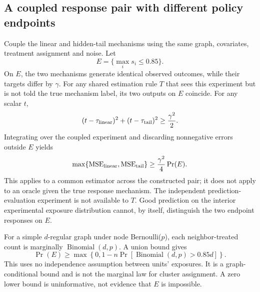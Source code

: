 \subsection{A coupled response pair with different policy endpoints}
\label{app:coupling}
Couple the linear and hidden-tail mechanisms using the same graph, covariates, treatment assignment and noise. Let
\begin{equation}
 E=\{\max_i s_i\leq 0.85\}.
\end{equation}
On $E$, the two mechanisms generate identical observed outcomes, while their targets differ by $\gamma$. For any shared estimation rule $T$ that sees this experiment but is not told the true mechanism label, its two outputs on $E$ coincide. For any scalar $t$,
\begin{equation}
 (t-\tau_{\rm linear})^2+(t-\tau_{\rm tail})^2\geq\frac{\gamma^2}{2}.
\end{equation}
Integrating over the coupled experiment and discarding nonnegative errors outside $E$ yields
\begin{equation}
 \max\{\mathrm{MSE}_{\rm linear},\mathrm{MSE}_{\rm tail}\}
 \geq\frac{\gamma^2}{4}\Pr(E).
 \label{eq:coupling}
\end{equation}
This applies to a common estimator across the constructed pair; it does not apply to an oracle given the true response mechanism. The independent prediction-evaluation experiment is not available to $T$. Good prediction on the interior experimental exposure distribution cannot, by itself, distinguish the two endpoint responses on $E$.

For a simple $d$-regular graph under node Bernoulli($p$), each neighbor-treated count is marginally $\operatorname{Binomial}(d,p)$. A union bound gives
\begin{equation}
 \Pr(E)\geq\max\left\{0,1-n\Pr\!\left[\operatorname{Binomial}(d,p)>0.85d\right]\right\}.
\end{equation}
This uses no independence assumption between units' exposures. It is a graph-conditional bound and is not the marginal law for cluster assignment. A zero lower bound is uninformative, not evidence that $E$ is impossible.


